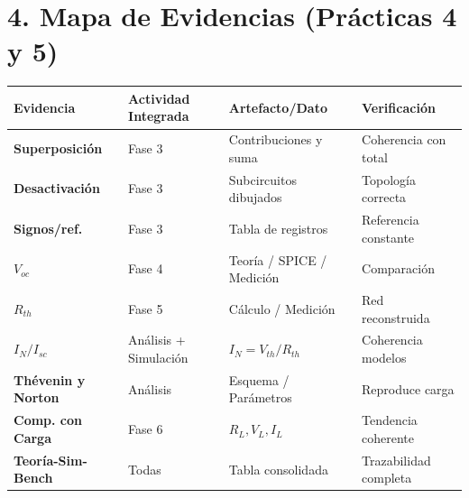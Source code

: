 \documentclass[11pt, a4paper]{article}
\begin{document}
\section*{4. Mapa de Evidencias (Prácticas 4 y 5)}
\noindent %
\begin{tabularx}{\textwidth}{|>{\RaggedRight\bfseries}p{2.2cm}|>{\RaggedRight}X|>{\RaggedRight}X|>{\RaggedRight}X|}
\hline
\rowcolor{ucbblue!10}
\textbf{Evidencia} & \textbf{Actividad Integrada} & \textbf{Artefacto/Dato} & \textbf{Verificación} \\ \hline
Superposición & Fase 3 & Contribuciones y suma & Coherencia con total \\ \hline
Desactivación & Fase 3 & Subcircuitos dibujados & Topología correcta \\ \hline
Signos/ref. & Fase 3 & Tabla de registros & Referencia constante \\ \hline
$V_{oc}$ & Fase 4 & Teoría / SPICE / Medición & Comparación \\ \hline
$R_{th}$ & Fase 5 & Cálculo / Medición & Red reconstruida \\ \hline
$I_N / I_{sc}$ & Análisis + Simulación & $I_N = V_{th}/R_{th}$ & Coherencia modelos \\ \hline
Thévenin y Norton & Análisis & Esquema / Parámetros & Reproduce carga \\ \hline
Comp. con Carga & Fase 6 & $R_L, V_L, I_L$ & Tendencia coherente \\ \hline
Teoría-Sim-Bench & Todas & Tabla consolidada & Trazabilidad completa \\ \hline
\end{tabularx}
\end{document}
